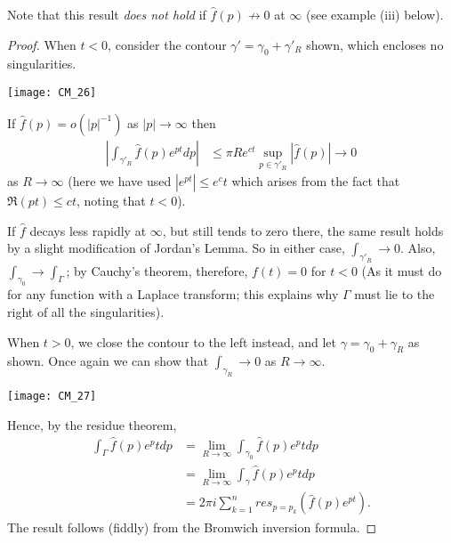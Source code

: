 \documentclass[a4paper]{article}
\begin{document}
Note that this result \emph{does not hold} if $\hat{f}(p) \not\to 0$ at $\infty$ (see example (iii) below).
\begin{proof}
When $t<0$, consider the contour $\gamma' = \gamma_0 + \gamma'_R$ shown, which encloses no singularities.

\texttt{[image: CM\_26]}

If $\hat{f}(p) = o(|p|^{-1})$ as $|p|\to \infty$ then
\begin{equation*}
\begin{aligned}
\left|\int_{\gamma'_R} \hat{f}(p) e^{pt} dp\right| &\leq \pi R e^{ct} \sup_{p \in \gamma'_R} |\hat{f}(p)| \to 0
\end{aligned}
\end{equation*}
as $R \to \infty$ (here we have used $|e^{pt}| \leq e^ct$ which arises from the fact that $\Re(pt) \leq ct$, noting that $t<0$).

If $\hat{f}$ decays less rapidly at $\infty$, but still tends to zero there, the same result holds by a slight modification of Jordan's Lemma. So in either case, $\int_{\gamma'_R} \to 0$. Also, $\int_{\gamma_0} \to \int_\Gamma$; by Cauchy's theorem, therefore, $f(t) = 0$ for $t<0$ (As it must do for any function with a Laplace transform; this explains why $\Gamma$ must lie to the right of all the singularities).

When $t>0$, we close the contour to the left instead, and let $\gamma = \gamma_0+\gamma_R$ as shown. Once again we can show that $\int_{\gamma_R} \to 0$ as $R \to \infty$.

\texttt{[image: CM\_27]}

Hence, by the residue theorem,
\begin{equation*}
\begin{aligned}
\int_\Gamma \hat{f}(p) e^pt dp &= \lim_{R \to \infty} \int_{\gamma_0}\hat{f}(p) e^pt dp\\
&= \lim_{R \to \infty} \int_{\gamma}\hat{f}(p) e^pt dp\\
&= 2\pi i \sum_{k=1}^n res_{p=p_k} (\hat{f}(p) e^{pt}).
\end{aligned}
\end{equation*}
The result follows (fiddly) from the Bromwich inversion formula.
\end{proof}
\end{document}
